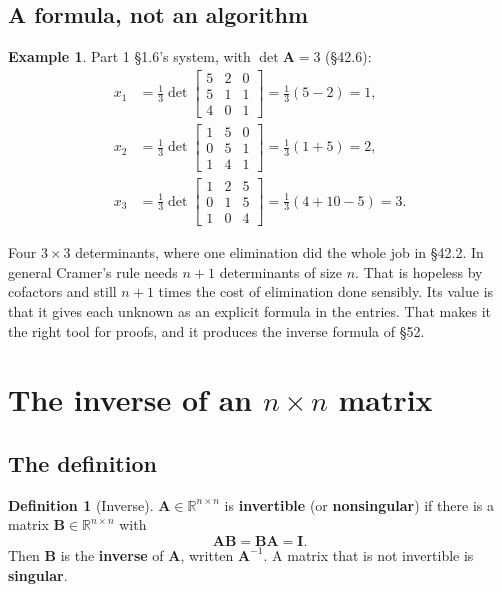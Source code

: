 \documentclass[11pt]{article}
\theoremstyle{plain}
\theoremstyle{definition}
\newtheorem{defn}{Definition}[section]
\newtheorem{ex}{Example}[section]
\theoremstyle{remark}
\newcommand{\R}{\mathbb{R}}
\newcommand{\mt}[1]{\mathbf{#1}}
\begin{document}
\subsection{A formula, not an algorithm}
\begin{ex}
Part 1 \S1.6's system, with $\det\mt{A}=3$ (\S42.6):
\[
  \begin{aligned}
  x_1&=\tfrac13\det\begin{bmatrix}5&2&0\\5&1&1\\4&0&1\end{bmatrix}=\tfrac13(5-2)=1,\\
  x_2&=\tfrac13\det\begin{bmatrix}1&5&0\\0&5&1\\1&4&1\end{bmatrix}=\tfrac13(1+5)=2,\\
  x_3&=\tfrac13\det\begin{bmatrix}1&2&5\\0&1&5\\1&0&4\end{bmatrix}=\tfrac13(4+10-5)=3 .
  \end{aligned}
\]
\end{ex}

\noindent Four $3\times3$ determinants, where one elimination did the whole job in
\S42.2. In general Cramer's rule needs $n+1$ determinants of size $n$. That is
hopeless by cofactors and still $n+1$ times the cost of elimination done
sensibly. Its value is that it gives each unknown as an explicit formula in the
entries. That makes it the right tool for proofs, and it produces the inverse
formula of \S52.

\section{The inverse of an \texorpdfstring{$n\times n$}{n x n} matrix}

\subsection{The definition}
\begin{defn}[Inverse]
$\mt{A}\in\R^{n\times n}$ is \textbf{invertible} (or \textbf{nonsingular}) if
there is a matrix $\mt{B}\in\R^{n\times n}$ with
\[
  \mt{A}\mt{B}=\mt{B}\mt{A}=\mt{I}.
\]
Then $\mt{B}$ is the \textbf{inverse} of $\mt{A}$, written $\mt{A}^{-1}$. A matrix
that is not invertible is \textbf{singular}.
\end{defn}
\end{document}
